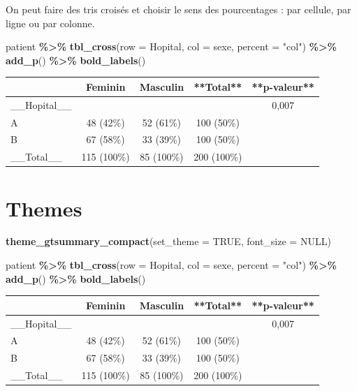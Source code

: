\documentclass[
]{book}
\newenvironment{Shaded}{\begin{snugshade}}{\end{snugshade}}
\newcommand{\AttributeTok}[1]{\textcolor[rgb]{0.13,0.29,0.53}{#1}}
\newcommand{\ConstantTok}[1]{\textcolor[rgb]{0.56,0.35,0.01}{#1}}
\newcommand{\FunctionTok}[1]{\textcolor[rgb]{0.13,0.29,0.53}{\textbf{#1}}}
\newcommand{\NormalTok}[1]{#1}
\newcommand{\SpecialCharTok}[1]{\textcolor[rgb]{0.81,0.36,0.00}{\textbf{#1}}}
\newcommand{\StringTok}[1]{\textcolor[rgb]{0.31,0.60,0.02}{#1}}
\begin{document}
On peut faire des tris croisés et choisir le sens des pourcentages : par cellule,
par ligne ou par colonne.

\begin{Shaded}
\begin{Highlighting}[]
\NormalTok{patient }\SpecialCharTok{\%\textgreater{}\%}
  \FunctionTok{tbl\_cross}\NormalTok{(}\AttributeTok{row =}\NormalTok{ Hopital, }\AttributeTok{col =}\NormalTok{ sexe, }\AttributeTok{percent =} \StringTok{"col"}\NormalTok{) }\SpecialCharTok{\%\textgreater{}\%}
  \FunctionTok{add\_p}\NormalTok{() }\SpecialCharTok{\%\textgreater{}\%}
  \FunctionTok{bold\_labels}\NormalTok{()}
\end{Highlighting}
\end{Shaded}

\begin{tabular}{l|c|c|c|c}
\hline
 & Feminin & Masculin & **Total** & **p-valeur**\\
\hline
\_\_Hopital\_\_ &  &  &  & 0,007\\
\hline
A & 48 (42\%) & 52 (61\%) & 100 (50\%) & \\
\hline
B & 67 (58\%) & 33 (39\%) & 100 (50\%) & \\
\hline
\_\_Total\_\_ & 115 (100\%) & 85 (100\%) & 200 (100\%) & \\
\hline
\end{tabular}

\hypertarget{themes}{%
\section{Themes}\label{themes}}

\begin{Shaded}
\begin{Highlighting}[]
\FunctionTok{theme\_gtsummary\_compact}\NormalTok{(}\AttributeTok{set\_theme =} \ConstantTok{TRUE}\NormalTok{, }\AttributeTok{font\_size =} \ConstantTok{NULL}\NormalTok{)}

\NormalTok{patient }\SpecialCharTok{\%\textgreater{}\%}
  \FunctionTok{tbl\_cross}\NormalTok{(}\AttributeTok{row =}\NormalTok{ Hopital, }\AttributeTok{col =}\NormalTok{ sexe, }\AttributeTok{percent =} \StringTok{"col"}\NormalTok{) }\SpecialCharTok{\%\textgreater{}\%}
  \FunctionTok{add\_p}\NormalTok{() }\SpecialCharTok{\%\textgreater{}\%}
  \FunctionTok{bold\_labels}\NormalTok{()}
\end{Highlighting}
\end{Shaded}

\begin{tabular}{l|c|c|c|c}
\hline
 & Feminin & Masculin & **Total** & **p-valeur**\\
\hline
\_\_Hopital\_\_ &  &  &  & 0,007\\
\hline
A & 48 (42\%) & 52 (61\%) & 100 (50\%) & \\
\hline
B & 67 (58\%) & 33 (39\%) & 100 (50\%) & \\
\hline
\_\_Total\_\_ & 115 (100\%) & 85 (100\%) & 200 (100\%) & \\
\hline
\end{tabular}
\end{document}
